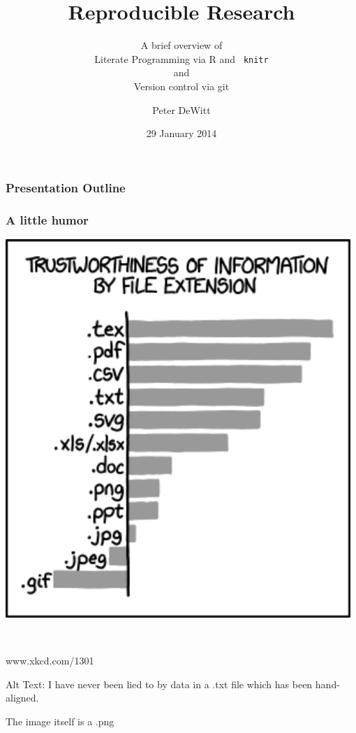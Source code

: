 \documentclass[t]{beamer}\usepackage[]{graphicx}\usepackage[]{color}
\title[Reproducible Research]{Reproducible Research}
\subtitle{A brief overview of\\Literate Programming via R and {\tt
knitr}\\and\\Version control via git}
\author{Peter DeWitt}
\institute{University of Colorado Anschutz Medical Campus 
 
Department of Biostatistics}
\date{29 January 2014}
\begin{document}
\begin{frame}[fragile]
  \titlepage
\end{frame}

\section*{} 
\begin{frame}
  \frametitle{Presentation Outline}
  \tableofcontents
\end{frame}

\begin{frame}
  \frametitle{A little humor}
  \begin{minipage}[m]{0.58\textwidth}
    \includegraphics[width=0.98\textwidth]{figure/file_extensions.png}
  \end{minipage}
  ~
  \begin{minipage}[m]{0.38\textwidth}
    \begin{center} 
       www.xkcd.com/1301
    \end{center}

       Alt Text: I have never been lied to by data in a .txt file which has been
       hand-aligned.

       \vspace{0.5in}

       The image itself is a .png
  \end{minipage} 
\end{frame}
\end{document}
